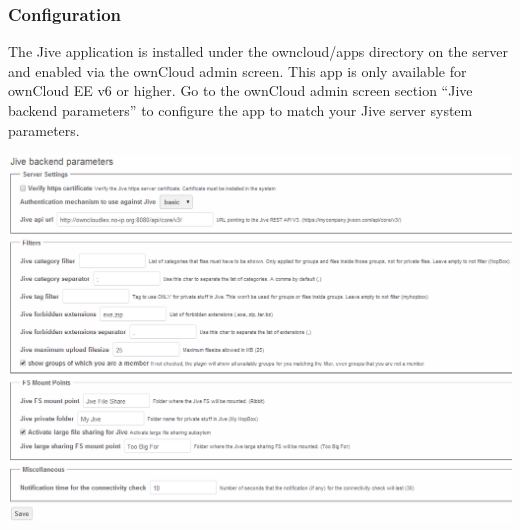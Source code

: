 \documentclass[letterpaper,10pt,english]{sphinxmanual}
\begin{document}
\subsubsection{Configuration}
\label{enterprise_external_storage/jive_configuration:configuration}
The Jive application is installed under the owncloud/apps directory on the server and enabled via the ownCloud
admin screen. This app is only available for ownCloud EE v6 or higher. Go to the ownCloud admin screen section
“Jive backend parameters” to configure the app to match your Jive server system parameters.

\includegraphics{jive_config.png}
\end{document}
